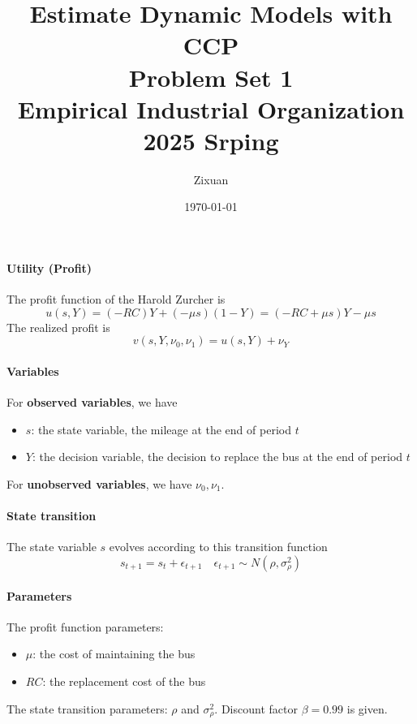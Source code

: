 \documentclass[12pt]{article}[margin=1in]
\title{\textbf{Estimate Dynamic Models with CCP} \\
    \vspace{.3cm}
    \large Problem Set 1 \\
    Empirical Industrial Organization 2025 Srping}
\author{Zixuan}
\date{\today}
\begin{document}
\maketitle

\setcounter{page}{1}

\paragraph{Utility (Profit)}
The profit function of the Harold Zurcher is
\begin{equation*}
    u(s,Y) = (-RC)Y + (-\mu s)(1 - Y) = (-RC + \mu s)Y - \mu s
\end{equation*}
The realized profit is
\begin{equation*}
    v(s,Y,\nu_0,\nu_1) = u(s,Y) + \nu_Y
\end{equation*}

\paragraph{Variables} For \textbf{observed variables}, we have
\begin{itemize}
    \item $s$: the state variable, the mileage at the end of period $t$
    \item $Y$: the decision variable, the decision to replace the bus at the end of period $t$
\end{itemize}
For \textbf{unobserved variables}, we have $\nu_0,\nu_1$.
\paragraph{State transition} The state variable $s$ evolves according to this
transition function
\begin{equation*}
    s_{t+1} = s_t + \epsilon_{t+1} \quad \epsilon_{t+1} \sim N(\rho, \sigma_{\rho}^2)
\end{equation*}
\paragraph{Parameters} The profit function parameters:
\begin{itemize}
    \item $\mu$: the cost of maintaining the bus
    \item $RC$: the replacement cost of the bus
\end{itemize}
The state transition parameters: $\rho$ and $\sigma_{\rho}^2$.
Discount factor $\beta=0.99$ is given.
\end{document}
